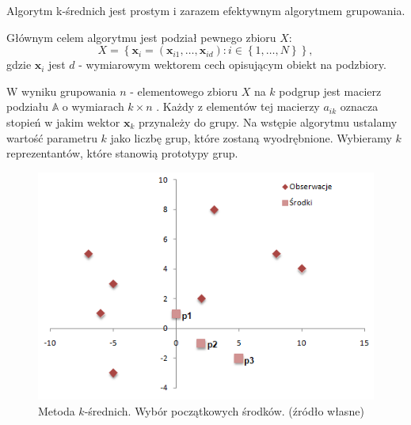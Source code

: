 \documentclass[12pt,a4paper]{report}
\newcommand{\set}[1]{\left\lbrace {#1} \right\rbrace}
\begin{document}
Algorytm k-średnich jest prostym i zarazem efektywnym algorytmem grupowania.

Głównym celem algorytmu jest podział pewnego zbioru $\mathit{X}$:
$$
\mathit{X} = \set{\mathbf{x}_i = (\mathbf{x}_{i1},\ldots,\mathbf{x}_{id}) : i \in \set{1,\ldots,N}},
$$
gdzie $\mathbf{x}_i$ jest $d$ - wymiarowym wektorem cech opisującym obiekt na podzbiory.

W wyniku grupowania $n$ - elementowego zbioru $\mathit{X}$ na $k$ podgrup jest macierz podziału $\mathbb{A}$ o wymiarach $k\times n$ . Każdy z elementów tej macierzy $a_{ik}$ oznacza stopień w jakim wektor $\mathbf{x}_k$ przynależy do grupy. Na wstępie algorytmu ustalamy wartość parametru $k$ jako liczbę grup, które zostaną wyodrębnione. Wybieramy $k$ reprezentantów, które stanowią prototypy grup.
\begin{center}
\begin{figure}[H]
\centering
\includegraphics[scale=0.8]{obrazy/ks_0.PNG} 
\caption{Metoda $k$-średnich. Wybór początkowych środków. (źródło własne)}
\end{figure}
\end{center}
\end{document}
